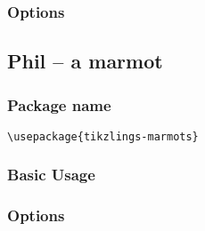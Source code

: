 \documentclass[parskip=half]{scrartcl}
\begin{document}
\begin{tcblisting}{}
\koala
\end{tcblisting}

\subsubsection{Options}

\begin{tcblisting}{}
\koala[body=SteelBlue]
\end{tcblisting}

\begin{tcblisting}{}
\koala[blush]
\end{tcblisting}

\begin{tcblisting}{}
\koala[sleeping]
\end{tcblisting}

\begin{tcblisting}{}
\koala[3D]
\end{tcblisting}


\clearpage
\subsection{Phil -- a marmot}

\subsubsection{Package name}

\begin{tcolorbox}
\vspace*{0.5cm}
\lstinline|\usepackage{tikzlings-marmots}|
\vspace*{0.5cm}
\end{tcolorbox}

\subsubsection{Basic Usage}

\begin{tcblisting}{}
\marmot
\end{tcblisting}

\subsubsection{Options}
\end{document}
